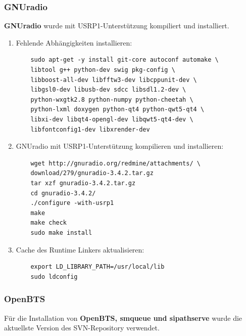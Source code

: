 \subsubsection{GNUradio}
\textbf{GNUradio} wurde mit USRP1-Unterstützung kompiliert und installiert. 

\begin{enumerate}
	\item Fehlende Abhängigkeiten installieren:
	\begin{verbatim}
	sudo apt-get -y install git-core autoconf automake \
	libtool g++ python-dev swig pkg-config \
	libboost-all-dev libfftw3-dev libcppunit-dev \
	libgsl0-dev libusb-dev sdcc libsdl1.2-dev \
	python-wxgtk2.8 python-numpy python-cheetah \
	python-lxml doxygen python-qt4 python-qwt5-qt4 \
	libxi-dev libqt4-opengl-dev libqwt5-qt4-dev \
	libfontconfig1-dev libxrender-dev
	\end{verbatim}
	\item GNUradio mit USRP1-Unterstützung kompilieren und installieren:
	\begin{verbatim}
	wget http://gnuradio.org/redmine/attachments/ \
	download/279/gnuradio-3.4.2.tar.gz
	tar xzf gnuradio-3.4.2.tar.gz
	cd gnuradio-3.4.2/
	./configure -with-usrp1
	make
	make check
	sudo make install
	\end{verbatim}
	\item Cache des Runtime Linkers aktualisieren:
	\begin{verbatim}
	export LD_LIBRARY_PATH=/usr/local/lib
	sudo ldconfig	
	\end{verbatim}
\end{enumerate}
 
\subsubsection{OpenBTS}
Für die Installation von \textbf{OpenBTS, smqueue und sipathserve} wurde die aktuellste Version des SVN-Repository verwendet.

